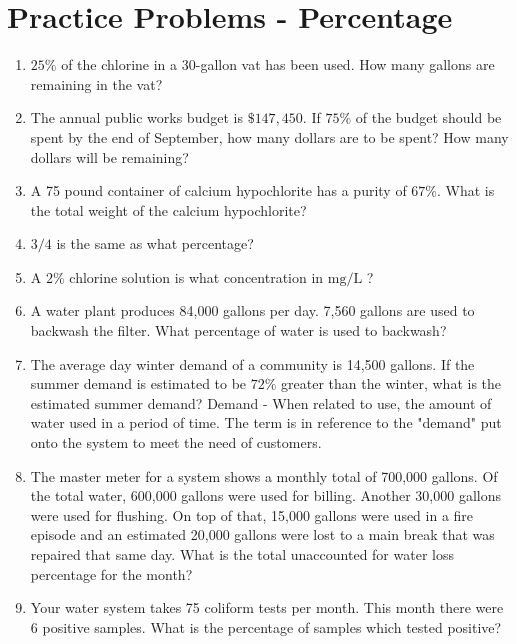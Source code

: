 \section*{Practice Problems - Percentage}
\begin{enumerate}
\item $25 \%$ of the chlorine in a 30-gallon vat has been used. How many gallons are remaining in the vat?

\item The annual public works budget is $\$ 147,450$. If $75 \%$ of the budget should be spent by the end of September, how many dollars are to be spent? How many dollars will be remaining?

\item A 75 pound container of calcium hypochlorite has a purity of $67 \%$. What is the total weight of the calcium hypochlorite? 

\item $3 / 4$ is the same as what percentage?

\item A $2 \%$ chlorine solution is what concentration in $\mathrm{mg} / \mathrm{L}$ ?

\item A water plant produces 84,000 gallons per day. 7,560 gallons are used to backwash the filter. What percentage of water is used to backwash?

\item The average day winter demand of a community is 14,500 gallons. If the summer demand is estimated to be $72 \%$ greater than the winter, what is the estimated summer demand? Demand - When related to use, the amount of water used in a period of time. The term is in reference to the "demand" put onto the system to meet the need of customers.

\item The master meter for a system shows a monthly total of 700,000 gallons. Of the total water, 600,000 gallons were used for billing. Another 30,000 gallons were used for flushing. On top of that, 15,000 gallons were used in a fire episode and an estimated 20,000 gallons were lost to a main break that was repaired that same day. What is the total unaccounted for water loss percentage for the month?

\item Your water system takes 75 coliform tests per month. This month there were 6 positive samples. What is the percentage of samples which tested positive?
\end{enumerate}

